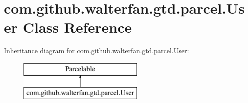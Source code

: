 \hypertarget{classcom_1_1github_1_1walterfan_1_1gtd_1_1parcel_1_1User}{\section{com.\-github.\-walterfan.\-gtd.\-parcel.\-User Class Reference}
\label{classcom_1_1github_1_1walterfan_1_1gtd_1_1parcel_1_1User}
}
Inheritance diagram for com.\-github.\-walterfan.\-gtd.\-parcel.\-User\-:\begin{figure}[H]
\begin{center}
\leavevmode
\includegraphics[height=2.000000cm]{classcom_1_1github_1_1walterfan_1_1gtd_1_1parcel_1_1User}
\end{center}
\end{figure}
